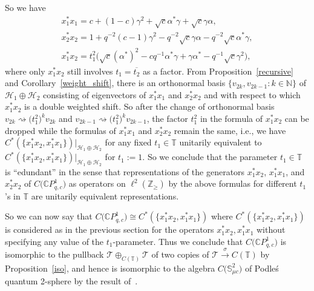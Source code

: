 \documentclass[pdftex]{sigma}
\begin{document}
So we have
\begin{gather*}
x_{1}^{\ast}x_{1} =c+(1-c) \gamma^{2}+\sqrt{c}\alpha^{\ast
}\gamma+\sqrt{c}\gamma\alpha,\\
x_{2}^{\ast}x_{2} =1+q^{-2}(c-1) \gamma^{2}-q^{-2}\sqrt
{c}\gamma\alpha-q^{-2}\sqrt{c}\alpha^{\ast}\gamma,\\
x_{1}^{\ast}x_{2} =t_{1}^{2}\big( \sqrt{c} ( \alpha^{\ast} )
^{2}-cq^{-1}\alpha^{\ast}\gamma+\gamma\alpha^{\ast}-q^{-1}\sqrt{c}\gamma
^{2}\big) ,
\end{gather*}
where only $x_{1}^{\ast}x_{2}$ still involves $t_{1}=\overline{t_{2}}$ as a
factor. From Proposition~\ref{recursive} and Corollary~\ref{weight_shift}, there is an orthonormal
basis $ \{ v_{2k},v_{2k-1}\colon k\in\mathbb{N} \} $ of $\mathcal{H}%
_{1}\oplus\mathcal{H}_{2}$ consisting of eigenvectors of $x_{1}^{\ast}x_{1}$
and $x_{2}^{\ast}x_{2}$ and with respect to which $x_{1}^{\ast}x_{2}$ is a
double weighted shift. So after the change of orthonormal basis $v_{2k}%
\rightsquigarrow\big( t_{1}^{2}\big) ^{k}v_{2k}$ and $v_{2k-1}%
\rightsquigarrow\big( t_{1}^{2}\big) ^{k}v_{2k-1}$, the factor $t_{1}%
^{2}$ in the formula of $x_{1}^{\ast}x_{2}$ can be dropped while the formulas
of $x_{1}^{\ast}x_{1}$ and $x_{2}^{\ast}x_{2}$ remain the same, i.e., we have
$C^{\ast} ( \{ x_{1}^{\ast}x_{2},x_{1}^{\ast}x_{1} \}
 ) |_{\mathcal{H}_{1}\oplus\mathcal{H}_{2}}$ for any fixed $t_{1}%
\in\mathbb{T}$ unitarily equivalent to $C^{\ast} ( \{ x_{1}^{\ast
}x_{2},x_{1}^{\ast}x_{1} \} ) |_{\mathcal{H}_{1}\oplus
\mathcal{H}_{2}}$ for $t_{1}:=1$. So we conclude that the parameter $t_{1}%
\in\mathbb{T}$ is ``edundant'' in the sense
that representations of the generators $x_{1}^{\ast}x_{2}$, $x_{1}^{\ast}%
x_{1}$, and $x_{2}^{\ast}x_{2}$ of $C\big( \mathbb{C}P_{q,c}^{1}\big) $
as operators on $\ell^{2} ( \mathbb{Z}_{\geq} ) $ by the above
formulas for different $t_{1}$'s in $\mathbb{T}$ are unitarily equivalent representations.

So we can now say that $C\big( \mathbb{C}P_{q,c}^{1}\big) \cong C^{\ast
}( \{ x_{1}^{\ast}x_{2},x_{1}^{\ast}x_{1}\} ) $
where $C^{\ast}( \{ x_{1}^{\ast}x_{2},x_{1}^{\ast}x_{1}\}
) $ is considered as in the previous section for the operators
$x_{1}^{\ast}x_{2},x_{1}^{\ast}x_{1}$ without specifying any value of the
$t_{1}$-parameter. Thus we conclude that $C\big( \mathbb{C}P_{q,c}^{1}\big) $ is isomorphic to the pullback $\mathcal{T}\oplus_{C(\mathbb{T}) }\mathcal{T}$ of two copies of $\mathcal{T}\overset{\sigma
}{\rightarrow}C(\mathbb{T}) $ by Proposition~\ref{iso}, and hence is
isomorphic to the algebra $C\big( \mathbb{S}_{\mu c}^{2}\big) $ of
Podle\'{s} quantum 2-sphere by the result of~\cite{Sh:qp}.
\end{document}
